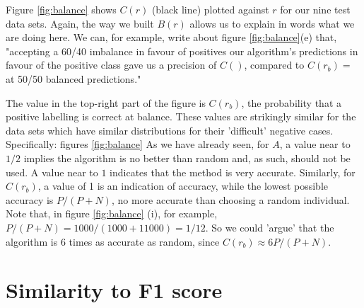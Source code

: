 \documentclass[preprint,12pt]{article}
\begin{document}
Figure \ref{fig:balance} shows $C(r)$ (black line) plotted against $r$ for our nine test data sets. Again, the way we built $B(r)$ allows us to explain in words what we are doing here. We can, for example, write about figure \ref{fig:balance}(e) that, "accepting a 60/40 imbalance in favour of positives our algorithm's predictions in favour of the positive class gave us a precision of $C()$, compared to $C(r_b)=$ at 50/50 balanced predictions." 

 The value in the top-right part of the figure is $C(r_b)$, the probability that a positive labelling is correct at balance. These values are strikingly similar for the data sets which have similar distributions for their 'difficult' negative cases. Specifically: figures \ref{fig:balance} 
As we have already seen, for $A$, a value near to $1/2$ implies the algorithm is no better than random and, as such, should not be used. A value near to $1$ indicates that the method is very accurate. Similarly, for $C(r_b)$, a value of 1 is an indication of accuracy, while the lowest possible accuracy is $P/(P+N)$, no more accurate than choosing a random individual. Note that, in figure \ref{fig:balance} (i), for example,  $P/(P+N)=1000/(1000+11000)=1/12$. So we could 'argue' that the algorithm is 6 times as accurate as random, since $C(r_b) \approx 6 P/(P+N)$. 



\section{Similarity to F1 score}
\end{document}
